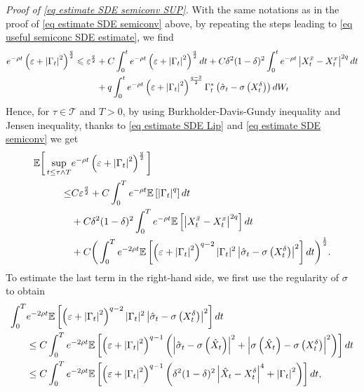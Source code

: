 \documentclass[11pt]{amsart}
\theoremstyle{plain}
\def \dd{{\rm d}}
\numberwithin{equation}{section}
\begin{document}
\smallbreak\noindent
\emph{Proof of \eqref{eq estimate SDE semiconv SUP}.}
With the same notations as in the proof of \eqref{eq estimate SDE semiconv} above, by repeating the steps leading to \eqref{eq useful semiconc SDE estimate}, we find
$$
\begin{aligned}
e^{-\rho t}\left(\varepsilon+\left|\Gamma_{t}\right|^{2}\right)^{\frac{q}{2}} \leqslant  \varepsilon^{\frac{q}{2}} & +C \int_{0}^{t} e^{-\rho t}\left(\varepsilon+\left|\Gamma_{t}\right|^{2}\right)^{\frac{q}{2}} \dd t+C  \delta^2(1-\delta)^2 \int_{0}^{t} e^{-\rho t}\left|X_{t}^{\bar{x}}-X_{t}^{x}\right|^{2 q} \dd t \\
& +q \int_{0}^{t} e^{-\rho t} \left(\varepsilon+\left|\Gamma_{t}\right|^{2}\right)^{\frac{q-2}{2}} \Gamma_{t}^{*}\left(\hat{\sigma}_{t}-\sigma\left(X_t^\delta\right)\right) \dd W_{t}
\end{aligned}
$$
Hence, for $\tau \in \mathcal T$ and $T >0$, by using Burkholder-Davis-Gundy inequality  and Jensen inequality, thanks to \eqref{eq estimate SDE Lip} and \eqref{eq estimate SDE semiconv} we get
\begin{equation}\label{eq estimate original semconc}
\begin{aligned}
\mathbb{E}\bigg[\sup _{t \leq \tau \land T} & e^{-\rho t}\left(\varepsilon+\left|\Gamma_ t \right|^{2}\right)^{\frac{q}{2}}\bigg]  \\
\leq & C \varepsilon^{\frac{q}{2}} 
+C \int_{0}^{T} e^{-\rho t} \mathbb E \left[  \left|\Gamma_{t}\right|^{q} \right] \dd t \\
& + C  \delta^2(1-\delta)^2 \int_{0}^{T} e^{-\rho t}\mathbb E \left[ \left|X_{t}^{\bar{x}}-X_{t}^{x}\right|^{2 q} \right] \dd t \\
& +C \bigg( \int_{0}^{T} e^{-2 \rho t} 
\mathbb E \left[ \left(\varepsilon+\left|\Gamma_{t}\right|^{2}\right)^{q-2} |\Gamma_{t}|^{2}\left| \hat{\sigma}_{t}-\sigma\left(X_t^\delta\right)\right|^2 \right] \dd t \bigg)^{\frac{1}{2}}.
\end{aligned}
\end{equation}
To estimate the last term in the right-hand side, we first use the regularity of $\sigma$ to obtain
$$
\begin{aligned}
\int_{0}^{T} &  e^{-2 \rho t} 
\mathbb E \left[ \left(\varepsilon+\left|\Gamma_{t}\right|^{2}\right)^{q-2} |\Gamma_{t}|^{2}\left| \hat{\sigma}_{t}-\sigma\left(X_t^\delta\right)\right|^2 \right] \dd t \\
& \leq C \int_{0}^{T} e^{-2 \rho t} 
\mathbb E \left[ \left(\varepsilon+\left|\Gamma_{t}\right|^{2}\right)^{q-1} \left( \left| \hat{\sigma}_{t}  - \sigma \left( \hat X _t \right) \right|^2 + \left| \sigma \left( \hat X _t \right) - \sigma\left(X_t^\delta\right)\right|^2 \right) \right] \dd t \\
& \leq C \int_{0}^{T} e^{-2 \rho t} 
\mathbb E \left[ \left(\varepsilon+\left|\Gamma_{t}\right|^{2}\right)^{q-1} \left( \delta^2 (1-\delta)^2  \left|   \hat X _t  - X_t^\delta \right|^4 + \left| \Gamma_t \right|^2 \right) \right] \dd t, 
\end{aligned}
$$
\end{document}
